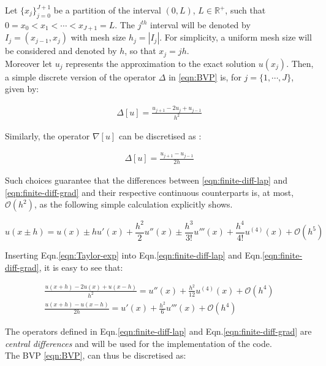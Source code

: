 \documentclass[11pt]{article}
\theoremstyle{theorem}
\theoremstyle{definition}
\begin{document}
Let $\lbrace x_j\rbrace_{j=0}^{J+1}$ be a partition of the interval $(0, L)$, $L\in\mathbb{R}^+$, such that $0=x_0<x_1<\cdots<x_{J+1}=L$. The $j^{th}$ interval will be denoted by $I_j=(x_{j-1}, x_j)$ with mesh size $h_j=|I_j|$. For simplicity, a uniform mesh size will be considered and denoted by $h$, so that $x_j=jh$.\\
Moreover let $u_j$ represents the approximation to the exact solution $u(x_j)$. Then, a simple discrete version of the operator $\Delta$ in \eqref{eqn:BVP} is, for $j=\lbrace 1, \cdots, J\rbrace$, given by:

\begin{align}
	\label{eqn:finite-diff-lap}
	\Delta[u]=\frac{u_{j+1}-2u_j+u_{j-1}}{h^2}
\end{align}

Similarly, the operator $\nabla [u]$ can be discretised as :

\begin{align}
\label{eqn:finite-diff-grad}
\Delta[u]=\frac{u_{j+1}-u_{j-1}}{2h}
\end{align}

Such choices guarantee that the differences between \eqref{eqn:finite-diff-lap} and \eqref{eqn:finite-diff-grad} and their respective continuous counterparts is, at most, $\mathcal{O}(h^2)$, as the following simple calculation explicitly shows. 

\begin{equation}\label{eqn:Taylor-exp}
u(x\pm h)=u(x)\pm hu'(x)+\frac{h^2}{2}u''(x)\pm \frac{h^3}{3!}u'''(x)+\frac{h^4}{4!}u^{(4)}(x)+\mathcal{O}(h^5)
\end{equation}

Inserting Eqn.\eqref{eqn:Taylor-exp} into Eqn.\ref{eqn:finite-diff-lap} and Eqn.\eqref{eqn:finite-diff-grad}, it is easy to see that:

\begin{align}
	\label{eqn:order-consistency}
	\frac{u(x+h)-2u(x)+u(x-h)}{h^2}=u''(x)+\frac{h^2}{12}u^{(4)}(x)+\mathcal{O}(h^4)\\
	\frac{u(x+h)-u(x-h)}{2h}=u'(x)+\frac{h^2}{6}u'''(x)+\mathcal{O}(h^4)
\end{align}

The operators defined in Eqn.\ref{eqn:finite-diff-lap} and Eqn.\eqref{eqn:finite-diff-grad} are \emph{central differences} and will be used for the implementation of the code.\\

The BVP \eqref{eqn:BVP}, can thus be discretised as:
\end{document}
